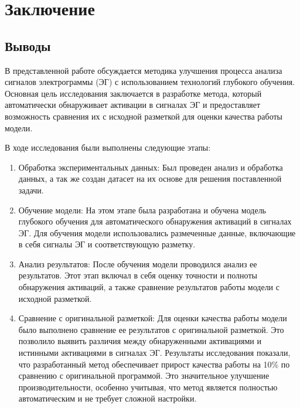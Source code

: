 \chapter{Заключение}
\section{Выводы}

В представленной работе обсуждается методика улучшения процесса анализа
сигналов электрограммы (ЭГ) с использованием технологий глубокого обучения.
Основная цель исследования заключается в разработке метода, который
автоматически обнаруживает активации в сигналах ЭГ и предоставляет возможность
сравнения их с исходной разметкой для оценки качества работы модели.

В ходе исследования были выполнены следующие этапы:

\begin{enumerate}

    \item Обработка экспериментальных данных: Был проведен анализ и обработка
    данных, а так же создан датасет на их основе для решения поставленной
    задачи.

    \item Обучение модели: На этом этапе была разработана и обучена модель глубокого
    обучения для автоматического обнаружения активаций в сигналах ЭГ. Для обучения
    модели использовались размеченные данные, включающие в себя сигналы ЭГ и
    соответствующую разметку.

    \item Анализ результатов: После обучения модели проводился
    анализ ее результатов. Этот этап включал в себя оценку точности и полноты
    обнаружения активаций, а также сравнение результатов работы модели с исходной
    разметкой.

    \item Сравнение с оригинальной разметкой: Для оценки качества работы
    модели было выполнено сравнение ее результатов с оригинальной разметкой. Это
    позволило выявить различия между обнаруженными активациями и истинными
    активациями в сигналах ЭГ. Результаты исследования показали, что разработанный
    метод обеспечивает прирост качества работы на 10\% по сравнению с оригинальной
    программой. Это значительное улучшение производительности, особенно учитывая,
    что метод является полностью автоматическим и не требует сложной настройки.

\end{enumerate}

